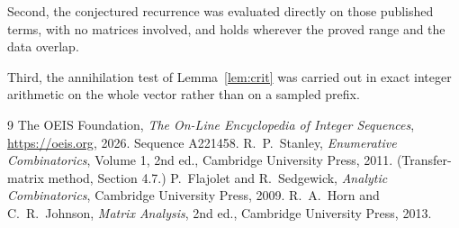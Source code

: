 \documentclass[11pt,a4paper]{article}
\theoremstyle{plain}
\theoremstyle{definition}
\begin{document}
Second, the conjectured recurrence was evaluated directly on those published terms, with no
matrices involved, and holds wherever the proved range and the data overlap.

Third, the annihilation test of Lemma~\ref{lem:crit} was carried out in exact integer
arithmetic on the whole vector rather than on a sampled prefix.

\begin{thebibliography}{9}
 The OEIS Foundation, \emph{The On-Line Encyclopedia of Integer
Sequences}, \url{https://oeis.org}, 2026. Sequence A221458.
 R.~P.~Stanley, \emph{Enumerative Combinatorics}, Volume 1, 2nd ed.,
Cambridge University Press, 2011. (Transfer-matrix method, Section 4.7.)
 P.~Flajolet and R.~Sedgewick, \emph{Analytic Combinatorics}, Cambridge
University Press, 2009.
 R.~A.~Horn and C.~R.~Johnson, \emph{Matrix Analysis}, 2nd ed., Cambridge
University Press, 2013.
\end{thebibliography}
\end{document}
